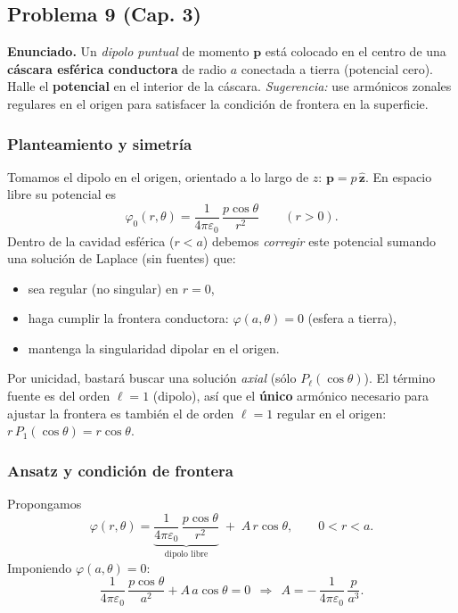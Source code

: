 \documentclass{article}
\begin{document}
\subsection{Problema 9 (Cap. 3)} \vspace{0.5cm}

\textbf{Enunciado.} Un \emph{dipolo puntual} de momento $\mathbf p$ está colocado en el centro de una \textbf{cáscara esférica conductora} de radio $a$ conectada a tierra (potencial cero). Halle el \textbf{potencial} en el interior de la cáscara. \emph{Sugerencia:} use armónicos zonales regulares en el origen para satisfacer la condición de frontera en la superficie.

\subsubsection*{Planteamiento y simetría}
Tomamos el dipolo en el origen, orientado a lo largo de $z$: $\mathbf p=p\,\hat{\mathbf z}$. En espacio libre su potencial es
\[
\varphi_0(r,\theta)=\frac{1}{4\pi\varepsilon_0}\,\frac{p\cos\theta}{r^{2}}
\qquad (r>0).
\]
Dentro de la cavidad esférica ($r<a$) debemos \emph{corregir} este potencial sumando una solución de Laplace (sin fuentes) que:
\begin{itemize}
\item sea regular (no singular) en $r=0$,
\item haga cumplir la frontera conductora: $\varphi(a,\theta)=0$ (esfera a tierra),
\item mantenga la singularidad dipolar en el origen.
\end{itemize}

Por unicidad, bastará buscar una solución \emph{axial} (sólo $P_\ell(\cos\theta)$). El término fuente es del orden $\ell=1$ (dipolo), así que el \textbf{único} armónico necesario para ajustar la frontera es también el de orden $\ell=1$ regular en el origen: $r\,P_1(\cos\theta)=r\cos\theta$.

\subsubsection*{Ansatz y condición de frontera}
Propongamos
\[
\varphi(r,\theta)=\underbrace{\frac{1}{4\pi\varepsilon_0}\,\frac{p\cos\theta}{r^{2}}}_{\text{dipolo libre}}
\;+\;A\,r\cos\theta,
\qquad 0<r<a.
\]
Imponiendo $\varphi(a,\theta)=0$:
\[
\frac{1}{4\pi\varepsilon_0}\,\frac{p\cos\theta}{a^{2}}+A\,a\cos\theta=0
\ \ \Longrightarrow\ \
A=-\,\frac{1}{4\pi\varepsilon_0}\,\frac{p}{a^{3}}.
\]
\end{document}
